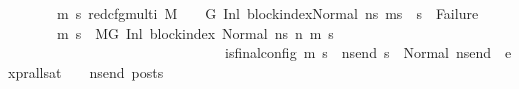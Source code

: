 \begin{isabellebody}
\ \ \ \ \ \ \ {\isachardoublequoteopen}{\isacharparenleft}{\kern0pt}{\isasymforall}m{\isacharprime}{\kern0pt}\ s{\isacharprime}{\kern0pt}{\isachardot}{\kern0pt}\ {\isacharparenleft}{\kern0pt}red{\isacharunderscore}{\kern0pt}cfg{\isacharunderscore}{\kern0pt}multi\ M\ {\isasymLambda}\ {\isasymGamma}\ {\isasymOmega}\ G\ {\isacharparenleft}{\kern0pt}{\isacharparenleft}{\kern0pt}Inl\ block{\isacharunderscore}{\kern0pt}index{\isacharparenright}{\kern0pt}{\isacharcomma}{\kern0pt}{\isacharparenleft}{\kern0pt}Normal\ ns{}{\isacharparenright}{\kern0pt}{\isacharparenright}{\kern0pt}\ {\isacharparenleft}{\kern0pt}m{\isacharprime}{\kern0pt}{\isacharcomma}{\kern0pt}s{\isacharprime}{\kern0pt}{\isacharparenright}{\kern0pt}{\isacharparenright}{\kern0pt}\ {\isasymlongrightarrow}\ {\isacharparenleft}{\kern0pt}s{\isacharprime}{\kern0pt}\ {\isasymnoteq}\ Failure{\isacharparenright}{\kern0pt}{\isacharparenright}{\kern0pt}{\isachardoublequoteclose}\isanewline
\ \ \ \ \ \ \ {\isachardoublequoteopen}{\isacharparenleft}{\kern0pt}{\isasymforall}m{\isacharprime}{\kern0pt}\ s{\isacharprime}{\kern0pt}{\isachardot}{\kern0pt}\ \ {\isacharparenleft}{\kern0pt}M{\isacharcomma}{\kern0pt}{\isasymLambda}{\isacharcomma}{\kern0pt}{\isasymGamma}{\isacharcomma}{\kern0pt}{\isasymOmega}{\isacharcomma}{\kern0pt}G\ {\isasymturnstile}{\isacharparenleft}{\kern0pt}Inl\ block{\isacharunderscore}{\kern0pt}index{\isacharcomma}{\kern0pt}\ Normal\ ns{}{\isacharparenright}{\kern0pt}\ {\isacharminus}{\kern0pt}n{\isasymrightarrow}{\isacharasterisk}{\kern0pt}\ {\isacharparenleft}{\kern0pt}m{\isacharprime}{\kern0pt}{\isacharcomma}{\kern0pt}\ s{\isacharprime}{\kern0pt}{\isacharparenright}{\kern0pt}{\isacharparenright}{\kern0pt}\ {\isasymlongrightarrow}\isanewline
\ \ \ \ \ \ \ \ \ \ \ \ \ \ \ \ \ \ \ \ \ \ \ \ \ \ \ \ \ \ \ is{\isacharunderscore}{\kern0pt}final{\isacharunderscore}{\kern0pt}config\ {\isacharparenleft}{\kern0pt}m{\isacharprime}{\kern0pt}{\isacharcomma}{\kern0pt}\ s{\isacharprime}{\kern0pt}{\isacharparenright}{\kern0pt}\ {\isasymlongrightarrow}\ {\isacharparenleft}{\kern0pt}{\isasymforall}ns{\isacharunderscore}{\kern0pt}end{\isachardot}{\kern0pt}\ s{\isacharprime}{\kern0pt}\ {\isacharequal}{\kern0pt}\ Normal\ ns{\isacharunderscore}{\kern0pt}end\ {\isasymlongrightarrow}\ {\isacharparenleft}{\kern0pt}expr{\isacharunderscore}{\kern0pt}all{\isacharunderscore}{\kern0pt}sat\ {\isasymLambda}\ {\isasymGamma}\ {\isasymOmega}\ ns{\isacharunderscore}{\kern0pt}end\ posts{\isacharparenright}{\kern0pt}{\isacharparenright}{\kern0pt}{\isacharparenright}{\kern0pt}{\isachardoublequoteclose}\isanewline

\end{isabellebody}
